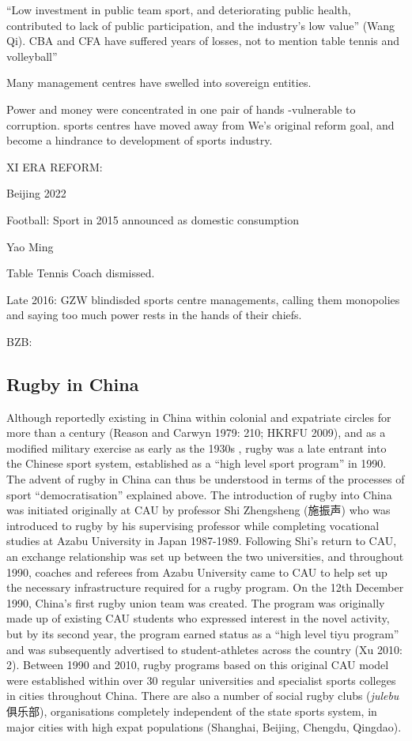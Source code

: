   ``Low investment in public team sport, and deteriorating public health, contributed to lack of public participation, and the industry’s low value'' (Wang Qi). CBA and CFA have suffered years of losses, not to mention table tennis and volleyball”

  Many management centres have swelled into sovereign entities.

  Power and money were concentrated in one pair of hands -vulnerable to corruption.  sports centres have moved away from We’s original reform goal, and become a hindrance to development of sports industry.


  XI ERA REFORM:

  Beijing 2022

  Football:
  Sport in 2015 announced as domestic consumption

  Yao Ming

  Table Tennis Coach dismissed.

  Late 2016:  GZW blindisded sports centre managements, calling them monopolies and saying too much power rests in the hands of their chiefs.


  BZB:












  \subsection{Rugby in China}
  Although reportedly existing in China within colonial and expatriate circles for more than a century (Reason and Carwyn 1979: 210; HKRFU 2009), and as a modified military exercise as early as the 1930s \citep[135]{Morris2004}, rugby was a late entrant into the Chinese sport system, established as a ``high level sport program'' in 1990.  The advent of rugby in China can thus be understood in terms of the processes of sport ``democratisation'' explained above.  The introduction of rugby into China was initiated originally at CAU by professor Shi Zhengsheng (施振声) who was introduced to rugby by his supervising professor while completing vocational studies at Azabu University in Japan 1987-1989.  Following Shi’s return to CAU, an exchange relationship was set up between the two universities, and throughout 1990, coaches and referees from Azabu University came to CAU to help set up the necessary infrastructure required for a rugby program.  On the 12th December 1990, China’s first rugby union team was created.  The program was originally made up of existing CAU students who expressed interest in the novel activity, but by its second year, the program earned status as a “high level tiyu program” and was subsequently advertised to student-athletes across the country (Xu 2010: 2).  Between 1990 and 2010, rugby programs based on this original CAU model were established within over 30 regular universities and specialist sports colleges in cities throughout China.  There are also a number of social rugby clubs (\textit{julebu} 俱乐部), organisations completely independent of the state sports system, in major cities with high expat populations (Shanghai, Beijing, Chengdu, Qingdao).

